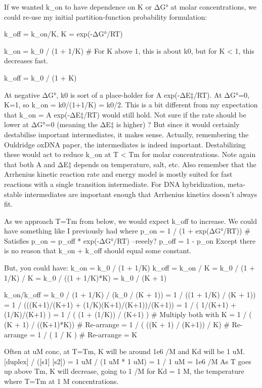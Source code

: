 If we wanted k_on to have dependence on K or ΔG° at molar concentrations,
we could re-use my initial partition-function probability formulation:

    k_off = k_on/K, K = exp(-ΔG°/RT)

    k_on  = k_0 / (1 + 1/K)     # For K above 1, this is about k0, but for K < 1, this decreases fast.

    k_off = k_0 / (1 + K)

    At negative ΔG°, k0 is sort of a place-holder for A exp(-ΔE‡/RT).
    At ΔG°=0, K=1, so k_on = k0/(1+1/K) = k0/2.
    This is a bit different from my expectation that k_on = A exp(-ΔE‡/RT) would still hold.
    Not sure if the rate should be lower at ΔG°=0 (meaning the ΔE‡ is higher) ?
    But since it would certainly destabilise important intermediates, it makes sense.
    Actually, remembering the Ouldridge oxDNA paper, the intermediates is indeed important.
    Destabilizing these would act to reduce k_on at T < Tm for molar concentrations.
    Note again that both A and ΔE‡ depends on temperature, salt, etc.
    Also remember that the Arrhenius kinetic reaction rate and energy model is mostly suited for
    fast reactions with a single transition intermediate.
    For DNA hybridization, meta-stable intermediates are important enough that Arrhenius kinetics
    doesn't always fit.


As we approach T=Tm from below, we would expect k_off to increase.
We could have something like I previously had where
        p_on  = 1 / (1 + exp(ΔG°/RT))      # Satisfies p_on = p_off * exp(-ΔG°/RT) --reeely?
        p_off = 1 - p_on
Except there is no reason that k_on + k_off should equal some constant.

But, you could have:
    k_on  = k_0 / (1 + 1/K)
    k_off = k_on / K
          = k_0 / (1 + 1/K) / K = k_0 / ((1 + 1/K)*K) = k_0 / (K + 1)

    k_on/k_off  = k_0 / (1 + 1/K) / (k_0 / (K + 1))
                = 1 / ((1 + 1/K) / (K + 1)) = 1 / (((K+1)/(K+1) + (1/K)(K+1)/(K+1))/(K+1))
                = 1 / ( 1/(K+1) + (1/K)/(K+1) )
                = 1 / ( (1 + (1/K)) / (K+1) )   # Multiply both with K
                = 1 / ( (K + 1) / ((K+1)*K))    # Re-arrange
                = 1 / ( ((K + 1) / (K+1)) / K)    # Re-arrange
                = 1 / ( 1 / K )    # Re-arrange
                = K

Often at uM conc, at T=Tm, K will be around 1e6 /M and Kd will be 1 uM.
    [duplex] / ([s1] [s2]) = 1 uM / (1 uM * 1 uM) = 1 / 1 uM = 1e6 /M
As T goes up above Tm, K will decrease, going to 1 /M for Kd = 1 M, the temperature where T=Tm at 1 M concentrations.

